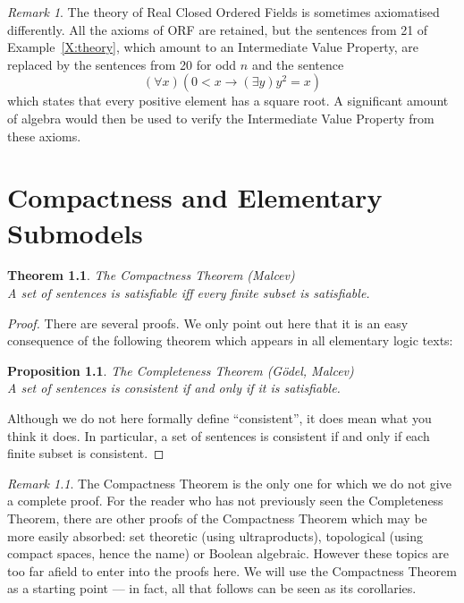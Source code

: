\documentclass[titlepage, oneside]{amsbook}
\theoremstyle{plain}
\newtheorem{theorem}{Theorem}
\newtheorem*{proposition}{Proposition}
\theoremstyle{definition}
\theoremstyle{remark}
\newtheorem*{rem}{Remark}
\begin{document}
\begin{rem}
%
%
 The theory of Real Closed Ordered Fields is sometimes
axiomatised differently.  All the axioms of ORF are retained, but the
sentences from 21 of Example~\ref{X:theory}, which amount to an
Intermediate Value Property, are replaced by the sentences from 20 for
odd $n$ and the sentence \[ ( \forall x)( 0< x \to ( \exists y ) y^2 =
x ) \] which states that every positive element has a square root.  A
significant amount of algebra would then be used to verify the
Intermediate Value Property from these axioms.

\end{rem}

\chapter{Compactness and Elementary Submodels}
\begin{theorem}\label{T:Malcev}
%
The Compactness Theorem (Malcev)\\
A set of sentences is satisfiable iff every finite subset is
satisfiable.
\end{theorem}

\begin{proof}
There are several proofs. We only point out here that it is an easy 
consequence  of the following theorem which appears in all
elementary logic texts:

\begin{proposition}\label{P:Malcev}
%
The Completeness Theorem (G\"{o}del, Malcev)\\
A set of sentences is consistent if and only if it is satisfiable.
\end{proposition}

 Although we do not here formally define ``consistent'', it
does mean what you think it does.  In particular, a set of sentences is
consistent if and only if each finite subset is consistent.

\end{proof}

\begin{rem}  The Compactness Theorem is the only one for which we do
not give a complete proof. For the reader who has not previously seen the
Completeness Theorem, there are other proofs of the Compactness Theorem  
which may be more easily
absorbed: set theoretic (using ultraproducts), topological (using
compact spaces, hence the name) or Boolean algebraic.  However these
topics are too far afield to enter into the proofs here.  We will use
the Compactness Theorem as a
starting point ---  in fact, all that follows can be seen as its
corollaries.
\end{rem} 
\end{document}
